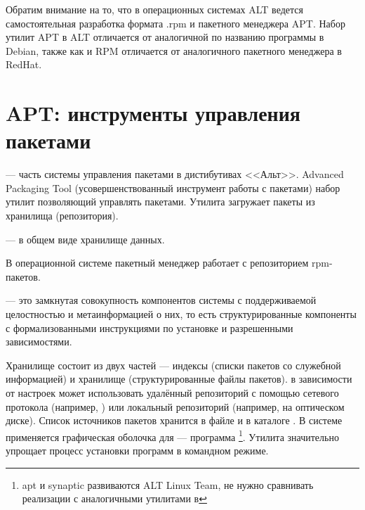 Обратим внимание на то, что в операционных системах ALT ведется самостоятельная
разработка формата .rpm и пакетного менеджера APT. Набор утилит APT в ALT отличается
от аналогичной по названию программы в Debian, также как и RPM отличается от
аналогичного пакетного менеджера в RedHat.

\section{APT: инструменты управления пакетами}
 --- часть системы управления пакетами в дистибутивах <<Альт>>. Advanced Packaging Tool
(усовершенствованный инструмент работы с пакетами) набор утилит позволяющий управлять пакетами.
Утилита загружает пакеты из хранилища (репозитория).

 ---  в общем виде хранилище данных.

В операционной системе  пакетный менеджер работает с репозиторием rpm-пакетов.

 --- это замкнутая совокупность компонентов системы с
поддерживаемой целостностью и метаинформацией о них, то есть структурированные
компоненты с формализованными инструкциями по установке и разрешенными зависимостями.

Хранилище состоит из двух частей --- индексы (списки пакетов со служебной информацией) и
хранилище (структурированные файлы пакетов).
 в зависимости от настроек может использовать удалённый репозиторий
с помощью сетевого протокола (например, ) или локальный репозиторий (например,
на оптическом диске).
Список источников пакетов хранится в файле
 и в каталоге . В системе  
применяется графическая оболочка для  --- программа \footnote{apt и synaptic 
	развиваются ALT Linux Team, не нужно сравнивать реализации с аналогичными утилитами в }.
Утилита  значительно упрощает процесс установки программ в командном режиме.



